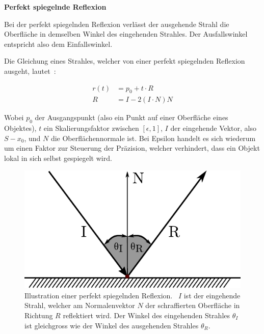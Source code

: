 \textbf{Perfekt spiegelnde Reflexion}

Bei der perfekt spiegelnden Reflexion verlässt der ausgehende Strahl die
Oberfläche in demselben Winkel des eingehenden Strahles. Der
Ausfallswinkel entspricht also dem Einfallswinkel.

Die Gleichung eines Strahles, welcher von einer perfekt spiegelnden
Reflexion ausgeht, lautet~\parencite[S. 132]{glassner_introduction_1989}:

\begin{align}
    r(t) &= p_{0} + t \cdot R \\
    R &= I - 2(I \cdot N)N
\end{align}

Wobei $p_{0}$ der Ausgangspunkt (also ein Punkt auf einer Oberfläche
eines Objektes), $t$ ein Skalierungsfaktor zwischen $[\epsilon, 1]$, $I$
der eingehende Vektor, also $S - x_{0}$, und $N$ die Oberflächennormale
ist. Bei Epsilon handelt es sich wiederum um einen Faktor zur Steuerung
der Präzision, welcher verhindert, dass ein Objekt lokal in sich selbst
gespiegelt wird.

\begin{figure}[H]\label{fig:ray_tracing_specular_reflection}
    \centering
    \includegraphics{img/perfect_specular_reflection.pdf}
    \caption{Illustration einer perfekt spiegelnden
        Reflexion.~\protect\footnotemark{}
        $I$ ist der eingehende Strahl, welcher am Normalenvektor $N$ der
        schraffierten Oberfläche in Richtung $R$ reflektiert wird. Der
        Winkel des eingehenden Strahles $\theta_{I}$ ist gleichgross wie der
        Winkel des ausgehenden Strahles $\theta_{R}$.}
\end{figure}


